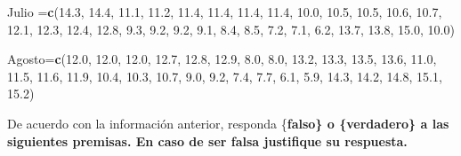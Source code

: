 \documentclass[
]{article}
\newenvironment{Shaded}{\begin{snugshade}}{\end{snugshade}}
\newcommand{\FloatTok}[1]{\textcolor[rgb]{0.00,0.00,0.81}{#1}}
\newcommand{\FunctionTok}[1]{\textcolor[rgb]{0.13,0.29,0.53}{\textbf{#1}}}
\newcommand{\NormalTok}[1]{#1}
\newcommand{\OtherTok}[1]{\textcolor[rgb]{0.56,0.35,0.01}{#1}}
\begin{document}
\begin{Shaded}
\begin{Highlighting}[]
\NormalTok{Julio }\OtherTok{=}\FunctionTok{c}\NormalTok{(}\FloatTok{14.3}\NormalTok{, }\FloatTok{14.4}\NormalTok{, }\FloatTok{11.1}\NormalTok{, }\FloatTok{11.2}\NormalTok{, }\FloatTok{11.4}\NormalTok{, }\FloatTok{11.4}\NormalTok{, }
         \FloatTok{11.4}\NormalTok{, }\FloatTok{11.4}\NormalTok{, }\FloatTok{10.0}\NormalTok{, }\FloatTok{10.5}\NormalTok{, }\FloatTok{10.5}\NormalTok{, }\FloatTok{10.6}\NormalTok{, }
         \FloatTok{10.7}\NormalTok{, }\FloatTok{12.1}\NormalTok{, }\FloatTok{12.3}\NormalTok{, }\FloatTok{12.4}\NormalTok{, }\FloatTok{12.8}\NormalTok{,  }\FloatTok{9.3}\NormalTok{,  }
         \FloatTok{9.2}\NormalTok{,  }\FloatTok{9.2}\NormalTok{, }\FloatTok{9.1}\NormalTok{,  }\FloatTok{8.4}\NormalTok{,  }\FloatTok{8.5}\NormalTok{,  }\FloatTok{7.2}\NormalTok{,  }
         \FloatTok{7.1}\NormalTok{,  }\FloatTok{6.2}\NormalTok{, }\FloatTok{13.7}\NormalTok{, }\FloatTok{13.8}\NormalTok{, }\FloatTok{15.0}\NormalTok{, }\FloatTok{10.0}\NormalTok{)}
    
\NormalTok{Agosto}\OtherTok{=}\FunctionTok{c}\NormalTok{(}\FloatTok{12.0}\NormalTok{, }\FloatTok{12.0}\NormalTok{, }\FloatTok{12.0}\NormalTok{, }\FloatTok{12.7}\NormalTok{, }\FloatTok{12.8}\NormalTok{, }\FloatTok{12.9}\NormalTok{, }
         \FloatTok{8.0}\NormalTok{, }\FloatTok{8.0}\NormalTok{, }\FloatTok{13.2}\NormalTok{, }\FloatTok{13.3}\NormalTok{, }\FloatTok{13.5}\NormalTok{, }\FloatTok{13.6}\NormalTok{, }
         \FloatTok{11.0}\NormalTok{, }\FloatTok{11.5}\NormalTok{, }\FloatTok{11.6}\NormalTok{, }\FloatTok{11.9}\NormalTok{, }\FloatTok{10.4}\NormalTok{, }\FloatTok{10.3}\NormalTok{, }
         \FloatTok{10.7}\NormalTok{,  }\FloatTok{9.0}\NormalTok{, }\FloatTok{9.2}\NormalTok{,  }\FloatTok{7.4}\NormalTok{,  }\FloatTok{7.7}\NormalTok{,  }\FloatTok{6.1}\NormalTok{,  }
         \FloatTok{5.9}\NormalTok{, }\FloatTok{14.3}\NormalTok{, }\FloatTok{14.2}\NormalTok{, }\FloatTok{14.8}\NormalTok{, }\FloatTok{15.1}\NormalTok{, }\FloatTok{15.2}\NormalTok{)}
\end{Highlighting}
\end{Shaded}

De acuerdo con la información anterior, responda \{\bf falso\} o
\{\bf verdadero\} a las siguientes premisas. En caso de ser falsa
justifique su respuesta.
\end{document}
